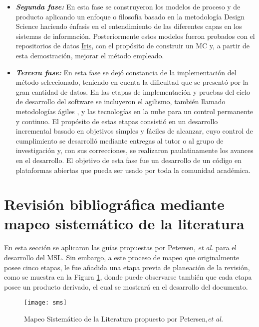 \begin{itemize}
\item \textbf{\textit{Segunda fase:}} En esta fase se construyeron los modelos de proceso y de producto aplicando un enfoque o filosofía basado en la metodología Design Science \cite{Vaishnavi2013} haciendo énfasis en el entendimiento de las diferentes capas en los sistemas de información. Posteriormente estos modelos fueron probados con el repositorios de datos \href{http://archive.ics.uci.edu/ml/datasets/Iris}{Iris}, con el propósito de construir un MC y, a partir de esta demostración, mejorar el método empleado.

\item \textbf{\textit{Tercera fase:}} En esta fase se dejó constancia de la implementación del método seleccionado, teniendo en cuenta la dificultad que se presentó por la gran cantidad de datos. En las etapas de implementación y pruebas del ciclo de desarrollo del software se incluyeron el agilismo, también llamado metodologías ágiles \cite{Alaimo2013}, y las tecnologías en la nube para un control permanente y continuo. El propósito de estas etapas consistió en un desarrollo incremental basado en objetivos simples y fáciles de alcanzar, cuyo control de cumplimiento se desarrolló mediante entregas al tutor o al grupo de investigación y, con sus correcciones, se realizaron paulatinamente los avances en el desarrollo.
El objetivo de esta fase fue un desarrollo de un código en plataformas abiertas que pueda ser usado por toda la comunidad académica.
\end{itemize}

\section{Revisión bibliográfica mediante mapeo sistemático de la literatura}

En esta sección se aplicaron las guías propuestas por Petersen, \textit{et al.} \cite{Petersen2008a} para el desarrollo del MSL. Sin embargo, a este proceso de mapeo que originalmente posee cinco etapas, le fue añadida una etapa previa de planeación de la revisión, como se muestra en la Figura \ref{sms}, donde puede observarse también que cada etapa posee un producto derivado, el cual se mostrará en el desarrollo del documento.
\newpage


\begin{figure}[h]
    \centering
    \texttt{[image: sms]}
    \caption{Mapeo Sistemático de la Literatura propuesto por Petersen,\textit{et al.}}
    \label{sms}
\end{figure}

